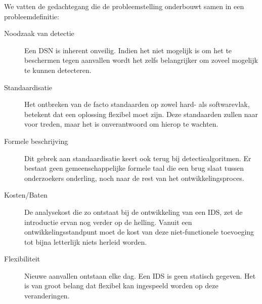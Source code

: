 We vatten de gedachtegang die de probleemstelling onderbouwt samen in een
probleemdefinitie:

\begin{description}

  \item[Noodzaak van detectie] Een DSN is inherent onveilig. Indien het niet
  mogelijk is om het te beschermen tegen aanvallen wordt het zelfs belangrijker
  om zoveel mogelijk te kunnen detecteren.

  \item[Standaardisatie] Het ontbreken van de facto standaarden op zowel hard-
  als softwarevlak, betekent dat een oplossing flexibel moet zijn. Deze
  standaarden zullen naar voor treden, maar het is onverantwoord om hierop te
  wachten.

  \item[Formele beschrijving] Dit gebrek aan standaardisatie keert ook terug
  bij detectiealgoritmen. Er bestaat geen gemeenschappelijke formele taal die
  een brug slaat tussen onderzoekers onderling, noch naar de rest van het
  ontwikkelingsproces.

  \item[Kosten/Baten] De analysekost die zo ontstaat bij de ontwikkeling van
  een IDS, zet de introductie ervan nog verder op de helling. Vanuit een
  ontwikkelingsstandpunt moet de kost van deze niet-functionele toevoeging tot
  bijna letterlijk niets herleid worden.

  \item[Flexibiliteit] Nieuwe aanvallen ontstaan elke dag. Een IDS is geen
  statisch gegeven. Het is van groot belang dat flexibel kan ingespeeld worden
  op deze veranderingen.

\end{description}
